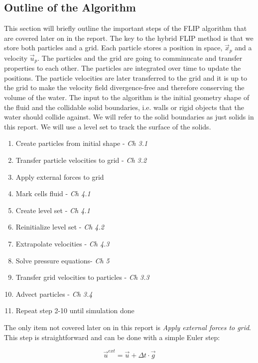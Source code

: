 \subsection{Outline of the Algorithm}

This section will briefly outline the important steps of the FLIP algorithm that are covered later on in the report. The key to the hybrid FLIP method is that we store both particles and a grid. Each particle stores a position in space, $\vec{x}_p$ and a velocity $\vec{u}_p$. The particles and the grid are going to comminucate and transfer properties to each other. The particles are integrated over time to update the positions. The particle velocities are later transferred to the grid and it is up to the grid to make the velocity field divergence-free and therefore conserving the volume of the water. The input to the algorithm is the initial geometry shape of the fluid and the collidable solid boundaries, i.e. walls or rigid objects that the water should collide against. We will refer to the solid boundaries as just solids in this report. We will use a level set to track the surface of the solids.

\begin{enumerate}
\item Create particles from initial shape - \emph{Ch 3.1}
\item Transfer particle velocities to grid - \emph{Ch 3.2}
\item Apply external forces to grid
\item Mark cells fluid - \emph{Ch 4.1}
\item Create level set - \emph{Ch 4.1}
\item Reinitialize level set - \emph{Ch 4.2}
\item Extrapolate velocities - \emph{Ch 4.3}
\item Solve pressure equations- \emph{Ch 5}
\item Transfer grid velocities to particles - \emph{Ch 3.3}
\item Advect particles - \emph{Ch 3.4}
\item Repeat step 2-10 until simulation done
\end{enumerate}

The only item not covered later on in this report is \emph{Apply external forces to grid}. This step is straightforward and can be done with a simple Euler step:

\begin{equation}
\vec{u}^{ext} = \vec{u} + \Delta t \cdot \vec{g}
\end{equation}
